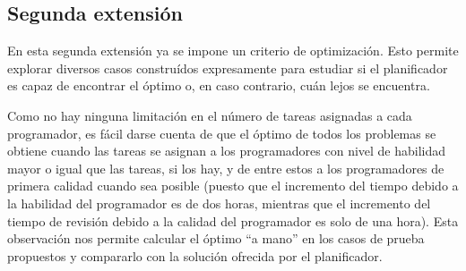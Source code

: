 
\subsection{Segunda extensión} \label{sec:res-ext2}

En esta segunda extensión ya se impone un criterio de optimización. Esto 
permite explorar diversos casos construídos expresamente para estudiar si 
el planificador es capaz de encontrar el óptimo o, en caso contrario, cuán 
lejos se encuentra. 

Como no hay ninguna limitación en el número de tareas asignadas a cada 
programador, es fácil darse cuenta de que el óptimo de todos los problemas se 
obtiene cuando las tareas se asignan a los programadores con nivel de 
habilidad mayor o igual que las tareas, si los hay, y de entre estos a los 
programadores de primera calidad cuando sea posible (puesto que el incremento 
del tiempo debido a la habilidad del programador es de dos horas, mientras 
que el incremento del tiempo de revisión debido a la calidad del programador 
es solo de una hora). Esta observación nos permite calcular el óptimo 
``a mano'' en los casos de prueba propuestos y compararlo con la solución 
ofrecida por el planificador.





